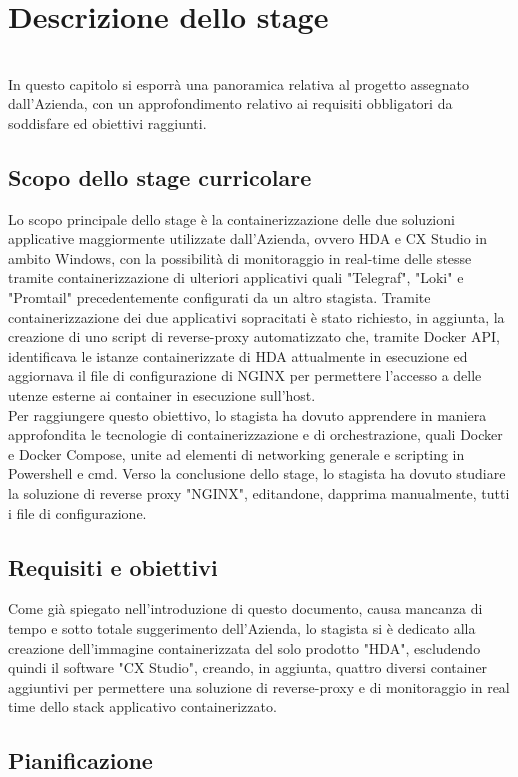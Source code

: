 
\chapter{Descrizione dello stage}
\label{cap:descrizione-stage}

\\
In questo capitolo si esporrà una panoramica relativa al progetto assegnato dall'Azienda, con un approfondimento relativo ai requisiti obbligatori da soddisfare ed obiettivi raggiunti. 

\section{Scopo dello stage curricolare}
Lo scopo principale dello stage è la containerizzazione delle due soluzioni applicative maggiormente utilizzate dall'Azienda, ovvero \gls{HDA} e \gls{CX Studio} in ambito Windows, con la possibilità di monitoraggio in real-time delle stesse tramite containerizzazione di ulteriori applicativi quali "Telegraf", "Loki" e "Promtail" precedentemente configurati da un altro stagista.
Tramite containerizzazione dei due applicativi sopracitati è stato richiesto, in aggiunta, la creazione di uno script di reverse-proxy automatizzato che, tramite Docker API, identificava le istanze containerizzate di HDA attualmente in esecuzione ed aggiornava il file di configurazione di NGINX per permettere l'accesso a delle utenze esterne ai container in esecuzione sull'host.\\
Per raggiungere questo obiettivo, lo stagista ha dovuto apprendere in maniera approfondita le tecnologie di containerizzazione e di orchestrazione, quali \gls{Docker} e \gls{Docker Compose}, unite ad elementi di networking generale e scripting in Powershell e cmd. Verso la conclusione dello stage, lo stagista ha dovuto studiare la soluzione di reverse proxy "NGINX", editandone, dapprima manualmente, tutti i file di configurazione.


\section{Requisiti e obiettivi}
Come già spiegato nell'introduzione di questo documento, causa mancanza di tempo e sotto totale suggerimento dell'Azienda, lo stagista si è dedicato alla creazione dell'immagine containerizzata del solo prodotto "HDA", escludendo quindi il software "CX Studio", creando, in aggiunta, quattro diversi container aggiuntivi per permettere una soluzione di reverse-proxy e di monitoraggio in real time dello stack applicativo containerizzato.

\section{Pianificazione}